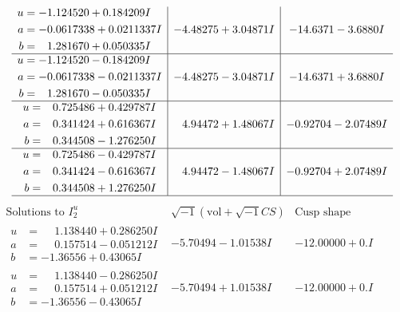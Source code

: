 \documentclass[1p]{elsarticle_modified}
\theoremstyle{definition}
\newcommand{\I}{\sqrt{-1}}
\begin{document}
$$\begin{array}{c|c|c}
\begin{aligned}
u &= -1.124520 + 0.184209 I \\
a &= -0.0617338 + 0.0211337 I \\
b &= \phantom{-}1.281670 + 0.050335 I\end{aligned}
 & -4.48275 + 3.04871 I & -14.6371 - 3.6880 I \\ \hline\begin{aligned}
u &= -1.124520 - 0.184209 I \\
a &= -0.0617338 - 0.0211337 I \\
b &= \phantom{-}1.281670 - 0.050335 I\end{aligned}
 & -4.48275 - 3.04871 I & -14.6371 + 3.6880 I \\ \hline\begin{aligned}
u &= \phantom{-}0.725486 + 0.429787 I \\
a &= \phantom{-}0.341424 + 0.616367 I \\
b &= \phantom{-}0.344508 - 1.276250 I\end{aligned}
 & \phantom{-}4.94472 + 1.48067 I & -0.92704 - 2.07489 I \\ \hline\begin{aligned}
u &= \phantom{-}0.725486 - 0.429787 I \\
a &= \phantom{-}0.341424 - 0.616367 I \\
b &= \phantom{-}0.344508 + 1.276250 I\end{aligned}
 & \phantom{-}4.94472 - 1.48067 I & -0.92704 + 2.07489 I\\
 \hline 
 \end{array}$$\newpage$$\begin{array}{c|c|c}  
\text{Solutions to }I^u_{2}& \I (\text{vol} + \sqrt{-1}CS) & \text{Cusp shape}\\
 \hline 
\begin{aligned}
u &= \phantom{-}1.138440 + 0.286250 I \\
a &= \phantom{-}0.157514 - 0.051212 I \\
b &= -1.36556 + 0.43065 I\end{aligned}
 & -5.70494 - 1.01538 I & -12.00000 + 0. I\phantom{ +0.000000I} \\ \hline\begin{aligned}
u &= \phantom{-}1.138440 - 0.286250 I \\
a &= \phantom{-}0.157514 + 0.051212 I \\
b &= -1.36556 - 0.43065 I\end{aligned}
 & -5.70494 + 1.01538 I & -12.00000 + 0. I\phantom{ +0.000000I} \\ \hline\begin{aligned}

\end{aligned}
\end{array}$$
\end{document}
